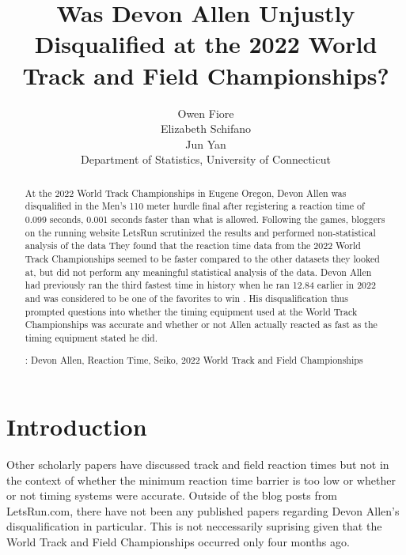\documentclass[12pt, letterpaper, titlepage]{article}
\title{Was Devon Allen Unjustly Disqualified at the 2022 World Track and Field Championships?}
\author{Owen Fiore\\
  Elizabeth Schifano\\
  Jun Yan\\[1ex]
  Department of Statistics, University of Connecticut\\
}
\date{}
\begin{document}
\maketitle

\doublespace

\begin{abstract}
  At the 2022 World Track Championships in Eugene Oregon, Devon Allen was disqualified in the
  Men's 110 meter hurdle final after registering a reaction time of 0.099 seconds, 0.001 
  seconds faster than what is allowed.  Following the games, bloggers on the running website 
  LetsRun scrutinized the results and performed non-statistical analysis of the data \citep{Johnson}
  They found that the reaction time data from the 2022 World Track Championships seemed to be faster 
  compared to the other datasets they looked at, but did not perform any meaningful statistical 
  analysis of the data.  Devon Allen had previously ran the third fastest time in history when 
  he ran 12.84 earlier in 2022 and was considered to be one of the favorites to win \citep{Preview}.  His 
  disqualification thus prompted questions into whether the timing equipment used at the World
  Track Championships was accurate and whether or not Allen actually reacted as fast as the 
  timing equipment stated he did.

\noindent{}:
Devon Allen, Reaction Time, Seiko, 2022 World Track and Field Championships 

\end{abstract}



\section{Introduction}
\label{sec:intro}

Other scholarly papers have discussed track and field reaction times but not in the
context of whether the minimum reaction time barrier is too low or whether or not timing
systems were accurate.  Outside of the blog posts from LetsRun.com, there have not been
any published papers regarding Devon Allen's disqualification in particular.  This is not
neccessarily suprising given that the World Track and Field Championships occurred only four months ago.
\end{document}
